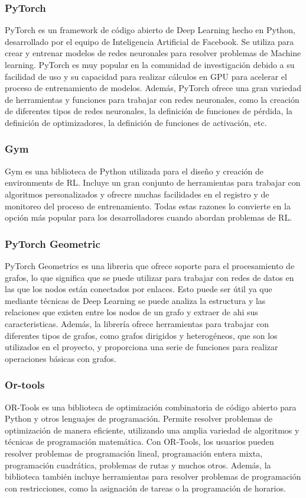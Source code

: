 \subsubsection{PyTorch}
PyTorch es un framework de código abierto de Deep Learning hecho en Python, desarrollado por el equipo 
de Inteligencia Artificial de Facebook. Se utiliza para crear y entrenar modelos de redes neuronales para resolver 
problemas de Machine learning. PyTorch es muy popular en la comunidad de investigación debido a su facilidad de uso 
y su capacidad para realizar cálculos en GPU para acelerar el proceso de entrenamiento de modelos. Además, PyTorch
ofrece una gran variedad de herramientas y funciones para trabajar con redes neuronales, como la creación de
diferentes tipos de redes neuronales, la definición de funciones de pérdida, la definición de optimizadores, la 
definición de funciones de activación, etc.

\subsubsection{Gym}
Gym es una biblioteca de Python utilizada para el diseño y creación de environments de RL. Incluye un 
gran conjunto de herramientas para trabajar con algoritmos personalizados y ofrecre muchas facilidades en 
el registro y de monitoreo del proceso de entrenamiento. Todas estas razones lo convierte en la opción más popular 
para los desarrolladores cuando abordan problemas de RL.

\subsubsection{PyTorch Geometric}
PyTorch Geometrics es una libreria que ofrece soporte para el procesamiento de grafos, lo que significa 
que se puede utilizar para trabajar con redes de datos en las que los nodos están conectados por enlaces. 
Esto puede ser útil ya que mediante técnicas de Deep Learning se puede analiza la estructura y las 
relaciones que existen entre los nodos de un grafo y extraer de ahi sus caracteristicas. Además, la 
librería ofrece herramientas para trabajar con diferentes tipos de grafos, como grafos dirigidos y heterogéneos, 
que son los utilizados en el proyecto, y proporciona una serie de funciones para realizar 
operaciones básicas con grafos.

\subsubsection{Or-tools}
OR-Tools es una biblioteca de optimización combinatoria de código abierto para Python y otros 
lenguajes de programación. Permite resolver problemas de optimización de manera eficiente, utilizando una 
amplia variedad de algoritmos y técnicas de programación matemática. Con OR-Tools, los usuarios pueden 
resolver problemas de programación lineal, programación entera mixta, programación cuadrática, 
problemas de rutas y muchos otros. Además, la biblioteca también incluye herramientas para resolver 
problemas de programación con restricciones, como la asignación de tareas o la programación de horarios.

